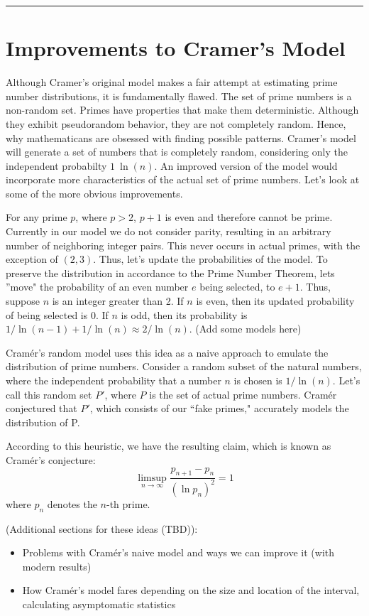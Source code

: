 \documentclass[conference]{IEEEtran}
\begin{document}
\vspace{2mm}
\hrule
\vspace{2mm}

\section{Improvements to Cramer's Model}

Although Cramer's original model makes a fair attempt at estimating prime number distributions, it is fundamentally flawed. The set of prime numbers is a non-random set. Primes have properties that make them deterministic. Although they exhibit pseudorandom behavior, they are not completely random. Hence, why mathematicans are obsessed with finding possible patterns. Cramer's model will generate a set of numbers that is completely random, considering only the independent probabilty $1 \ \ln(n)$. An improved version of the model would incorporate more characteristics of the actual set of prime numbers. Let's look at some of the more obvious improvements. 

For any prime $p$, where $p > 2$, $p + 1$ is even and therefore cannot be prime. Currently in our model we do not consider parity, resulting in an arbitrary number of neighboring integer pairs. This never occurs in actual primes, with the exception of $(2, 3)$. Thus, let's update the probabilities of the model. To preserve the distribution in accordance to the Prime Number Theorem, lets ''move" the probability of an even number $e$ being selected, to $e + 1$. Thus, suppose $n$ is an integer greater than 2. If $n$ is even, then its updated probability of being selected is 0. If $n$ is odd, then its probability is $1 / \ln(n - 1) + 1 / \ln(n) \approx 2 / \ln(n)$. 
(Add some models here)

Cram\'er's random model uses this idea as a naive approach to emulate the distribution of prime numbers. Consider a random subset of the natural numbers, where the independent probability that a number $n$ is chosen is $1 / \ln(n)$. Let's call this random set $P'$, where $P$ is the set of actual prime numbers. Cram\'er conjectured that $P'$, which consists of our ``fake primes," accurately models the distribution of P. 

According to this heuristic, we have the resulting claim, which is known as Cram\'er's conjecture:
\[\limsup_{n \to \infty} \frac{p_{n + 1} - p_n}{(\ln p_n)^2} = 1\]
where $p_n$ denotes the $n$-th prime.

(Additional sections for these ideas (TBD)):
\begin{itemize}
  \item Problems with Cram\'er's naive model and ways we can improve it (with modern results)
  \item How Cram\'er's model fares depending on the size and location of the interval, calculating asymptomatic statistics
\end{itemize}
\end{document}
